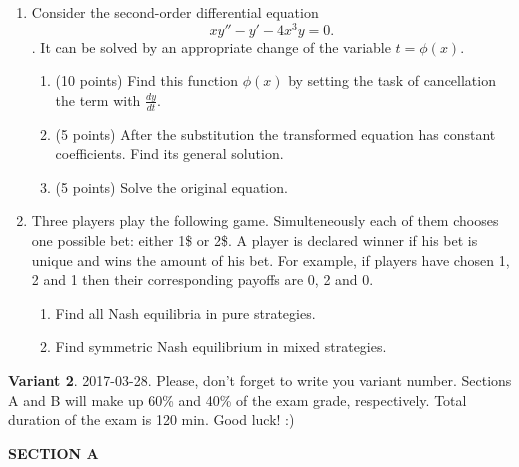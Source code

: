 \documentclass[12pt,a4paper]{article}
\begin{document}
\begin{enumerate}[resume]


\item Consider the second-order differential equation
\[
xy'' - y' - 4{x^3}y = 0.
\].
It can be solved by an appropriate change of the variable $t = \phi (x)$.
\begin{enumerate}
  \item (10 points) Find this function $\phi (x)$ by setting the task of cancellation the term with $\frac{{dy}}{{dt}}$.
  \item (5 points) After the substitution the transformed equation has constant coefficients. Find its general solution.
  \item (5 points) Solve the original equation.
\end{enumerate}

\item Three players play the following game. Simulteneously each of them chooses one possible bet: either 1\$ or 2\$. A player is declared winner if his bet is unique and wins the amount of his bet. For example, if players have chosen 1, 2 and 1 then their corresponding payoffs are 0, 2 and 0.

\begin{enumerate}
  \item Find all Nash equilibria in pure strategies.
  \item Find symmetric Nash equilibrium in mixed strategies.
\end{enumerate}

\end{enumerate}

\newpage
\thispagestyle{empty}
\textbf{Variant 2}. 2017-03-28. Please, don't forget to write you variant number. Sections A and B will make up 60\% and 40\% of the exam grade, respectively. Total duration of the exam is 120 min. Good luck! :)


\textbf{SECTION A}
\end{document}
